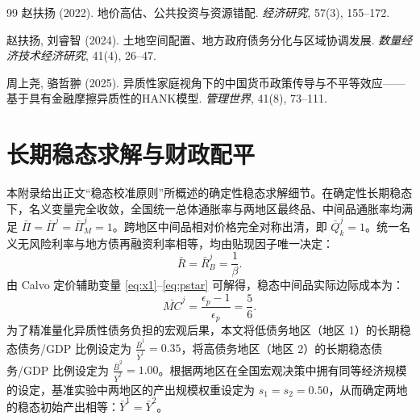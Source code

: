 \documentclass[12pt,UTF8]{ctexart}
\begin{document}
\begin{thebibliography}{99}
		赵扶扬 (2022). 地价高估、公共投资与资源错配. \textit{经济研究}, 57(3), 155--172.
		
		赵扶扬, 刘睿智 (2024). 土地空间配置、地方政府债务分化与区域协调发展. \textit{数量经济技术经济研究}, 41(4), 26--47.
		
		周上尧, 骆哲翀 (2025). 异质性家庭视角下的中国货币政策传导与不平等效应——基于具有金融摩擦异质性的HANK模型. \textit{管理世界}, 41(8), 73--111.
		
	\end{thebibliography}
	
	\newpage
	\appendix
	\section{长期稳态求解与财政配平}
	\label{app:steady_state}
	
	本附录给出正文“稳态校准原则”所概述的确定性稳态求解细节。在确定性长期稳态下，名义变量完全收敛，全国统一总体通胀率与两地区最终品、中间品通胀率均满足 $\bar{\Pi} = \bar{\Pi}^j = \bar{\Pi}_M^j = 1$。跨地区中间品相对价格完全对称出清，即 $\bar{Q}_{k}^j = 1$。统一名义无风险利率与地方债再融资利率相等，均由贴现因子唯一决定：
	\begin{equation}
		\bar{R} = \bar{R}_B^j = \frac{1}{\beta}.
	\end{equation}
	由 Calvo 定价辅助变量 \eqref{eq:x1}--\eqref{eq:pstar} 可解得，稳态中间品实际边际成本为：
	\begin{equation}
		\bar{MC}^j = \frac{\epsilon_p-1}{\epsilon_p} = \frac{5}{6}.
	\end{equation}
	为了精准量化异质性债务负担的宏观后果，本文将低债务地区（地区 1）的长期稳态债务/GDP 比例设定为 $\frac{\bar{B}^1}{\bar{Y}^1} = 0.35$，将高债务地区（地区 2）的长期稳态债务/GDP 比例设定为 $\frac{\bar{B}^2}{\bar{Y}^2} = 1.00$。根据两地区在全国宏观决策中拥有同等经济规模的设定，基准实验中两地区的产出规模权重设定为 $s_1 = s_2 = 0.50$，从而确定两地的稳态初始产出相等：$\bar{Y}^1 = \bar{Y}^2$。
	
\end{document}
